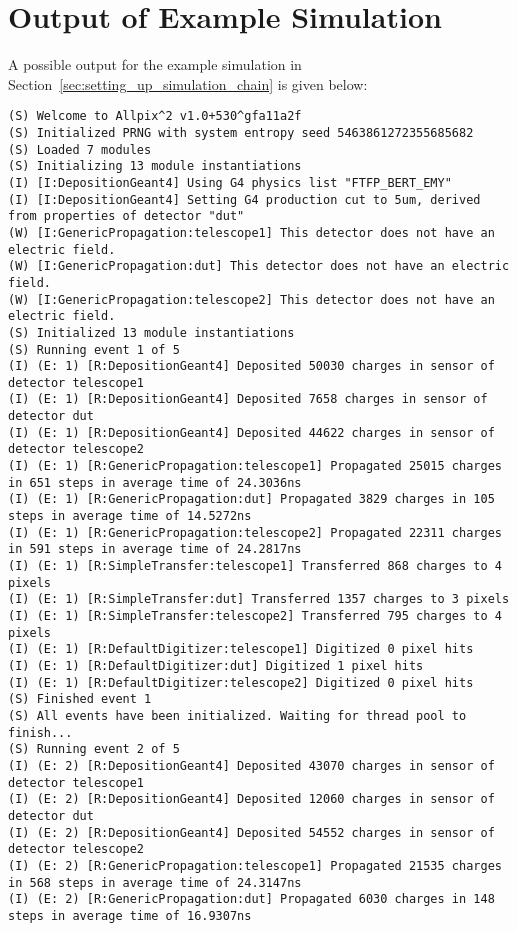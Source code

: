 \section{Output of Example Simulation}
\label{sec:example_output}
A possible output for the example simulation in Section~\ref{sec:setting_up_simulation_chain} is given below:

\begin{lstlisting}[breaklines]
(S) Welcome to Allpix^2 v1.0+530^gfa11a2f
(S) Initialized PRNG with system entropy seed 5463861272355685682
(S) Loaded 7 modules
(S) Initializing 13 module instantiations
(I) [I:DepositionGeant4] Using G4 physics list "FTFP_BERT_EMY"
(I) [I:DepositionGeant4] Setting G4 production cut to 5um, derived from properties of detector "dut"
(W) [I:GenericPropagation:telescope1] This detector does not have an electric field.
(W) [I:GenericPropagation:dut] This detector does not have an electric field.
(W) [I:GenericPropagation:telescope2] This detector does not have an electric field.
(S) Initialized 13 module instantiations
(S) Running event 1 of 5
(I) (E: 1) [R:DepositionGeant4] Deposited 50030 charges in sensor of detector telescope1
(I) (E: 1) [R:DepositionGeant4] Deposited 7658 charges in sensor of detector dut
(I) (E: 1) [R:DepositionGeant4] Deposited 44622 charges in sensor of detector telescope2
(I) (E: 1) [R:GenericPropagation:telescope1] Propagated 25015 charges in 651 steps in average time of 24.3036ns
(I) (E: 1) [R:GenericPropagation:dut] Propagated 3829 charges in 105 steps in average time of 14.5272ns
(I) (E: 1) [R:GenericPropagation:telescope2] Propagated 22311 charges in 591 steps in average time of 24.2817ns
(I) (E: 1) [R:SimpleTransfer:telescope1] Transferred 868 charges to 4 pixels
(I) (E: 1) [R:SimpleTransfer:dut] Transferred 1357 charges to 3 pixels
(I) (E: 1) [R:SimpleTransfer:telescope2] Transferred 795 charges to 4 pixels
(I) (E: 1) [R:DefaultDigitizer:telescope1] Digitized 0 pixel hits
(I) (E: 1) [R:DefaultDigitizer:dut] Digitized 1 pixel hits
(I) (E: 1) [R:DefaultDigitizer:telescope2] Digitized 0 pixel hits
(S) Finished event 1
(S) All events have been initialized. Waiting for thread pool to finish...
(S) Running event 2 of 5
(I) (E: 2) [R:DepositionGeant4] Deposited 43070 charges in sensor of detector telescope1
(I) (E: 2) [R:DepositionGeant4] Deposited 12060 charges in sensor of detector dut
(I) (E: 2) [R:DepositionGeant4] Deposited 54552 charges in sensor of detector telescope2
(I) (E: 2) [R:GenericPropagation:telescope1] Propagated 21535 charges in 568 steps in average time of 24.3147ns
(I) (E: 2) [R:GenericPropagation:dut] Propagated 6030 charges in 148 steps in average time of 16.9307ns

\end{lstlisting}
